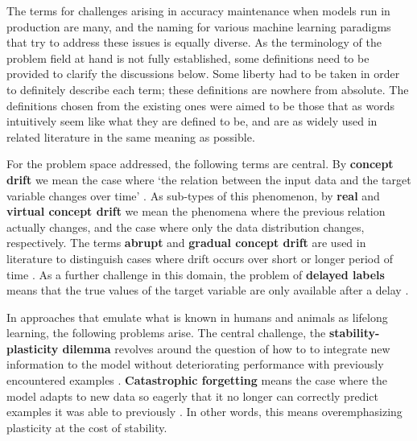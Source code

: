




The terms for challenges arising in accuracy maintenance when models run in production are many, and the naming for various machine learning paradigms that try to address these issues is equally diverse. As the terminology of the problem field at hand is not fully established, some definitions need to be provided to clarify the discussions below. Some liberty had to be taken in order to definitely describe each term; these definitions are nowhere from absolute. The definitions chosen from the existing ones were aimed to be those that as words intuitively seem like what they are defined to be, and are as widely used in related literature in the same meaning as possible. 

For the problem space addressed, the following terms are central. By \textbf{concept drift} we mean the case where `the relation between the input
data and the target variable changes over time' \cite{conceptdriftsurvey} \cite{schlimmer_incremental_1986}. As sub-types of this phenomenon, by \textbf{real} and \textbf{virtual concept drift} we mean the phenomena where the previous relation actually changes, and the case where only the data distribution changes, respectively. The terms \textbf{abrupt} and \textbf{gradual concept drift} are used in literature to distinguish cases where drift occurs over short or longer period of time \cite{zliobaite_driftsurvey}. As a further challenge in this domain, the problem of \textbf{delayed labels} means that the true values of the target variable are only available after a delay \cite{delayedlabelstreams}.

In approaches that emulate what is known in humans and animals as lifelong learning, the following problems arise. The central challenge, the \textbf{stability-plasticity dilemma} revolves around the question of how to to integrate new information to the model without deteriorating performance with previously encountered examples \cite{lmlinneuralnets}. \textbf{Catastrophic forgetting} means the case where the model adapts to new data so eagerly that it no longer can correctly predict examples it was able to previously \cite{lmlinneuralnets}. In other words, this means overemphasizing plasticity at the cost of stability.

